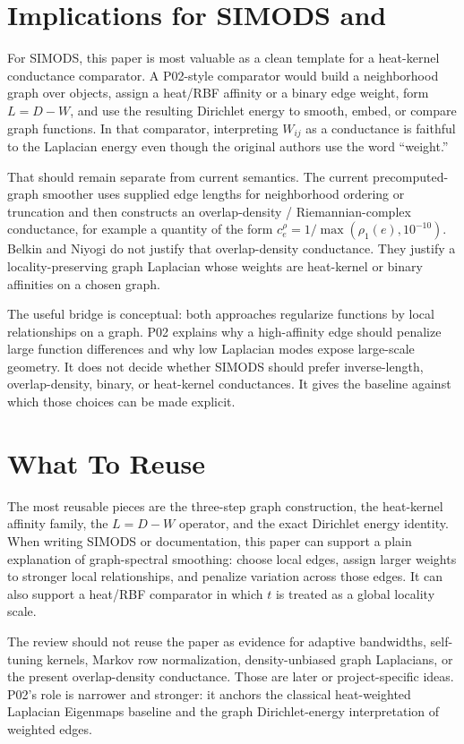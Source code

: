 \documentclass[11pt]{article}
\begin{document}
\section{Implications for SIMODS and }

For SIMODS, this paper is most valuable as a clean template for a heat-kernel
conductance comparator. A P02-style comparator would build a neighborhood graph
over objects, assign a heat/RBF affinity or a binary edge weight, form
\(L=D-W\), and use the resulting Dirichlet energy to smooth, embed, or compare
graph functions. In that comparator, interpreting \(W_{ij}\) as a conductance is
faithful to the Laplacian energy even though the original authors use the word
``weight.''

That should remain separate from current 
semantics. The current precomputed-graph smoother uses supplied edge lengths for
neighborhood ordering or truncation and then constructs an overlap-density /
Riemannian-complex conductance, for example a quantity of the form
\(c_e^\rho = 1/\max(\rho_1(e),10^{-10})\). Belkin and Niyogi do not justify that
overlap-density conductance. They justify a locality-preserving graph Laplacian
whose weights are heat-kernel or binary affinities on a chosen graph.

The useful bridge is conceptual: both approaches regularize functions by local
relationships on a graph. P02 explains why a high-affinity edge should penalize
large function differences and why low Laplacian modes expose large-scale
geometry. It does not decide whether SIMODS should prefer inverse-length,
overlap-density, binary, or heat-kernel conductances. It gives the baseline
against which those choices can be made explicit.

\section{What To Reuse}

The most reusable pieces are the three-step graph construction, the heat-kernel
affinity family, the \(L=D-W\) operator, and the exact Dirichlet energy identity.
When writing SIMODS or  documentation, this paper can support a
plain explanation of graph-spectral smoothing: choose local edges, assign larger
weights to stronger local relationships, and penalize variation across those
edges. It can also support a heat/RBF comparator in which \(t\) is treated as a
global locality scale.

The review should not reuse the paper as evidence for adaptive bandwidths,
self-tuning kernels, Markov row normalization, density-unbiased graph Laplacians,
or the present overlap-density conductance. Those are later or project-specific
ideas. P02's role is narrower and stronger: it anchors the classical
heat-weighted Laplacian Eigenmaps baseline and the graph Dirichlet-energy
interpretation of weighted edges.
\end{document}

